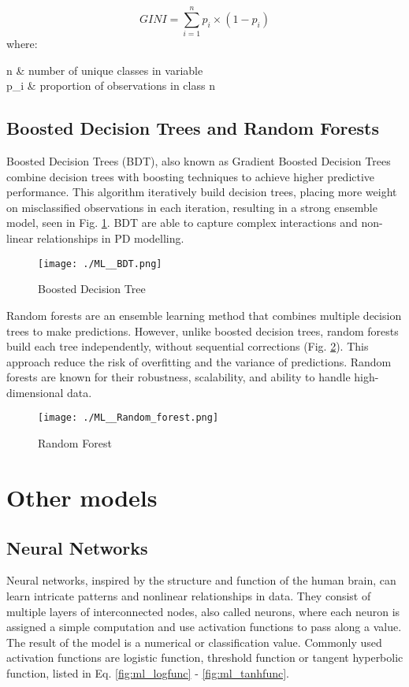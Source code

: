 \begin{equation}
GINI = \sum_{i=1}^{n}  p_i \times (1 - p_i) \label{eq:ml_gini}
\end{equation}
where:
\begin{conditions}
 n  	& number of unique classes in variable \\
 p_{i}  & proportion of observations in class n
\end{conditions}

\subsection{Boosted Decision Trees and Random Forests} 
Boosted Decision Trees (BDT), also known as Gradient Boosted Decision Trees combine decision trees with boosting techniques to achieve higher predictive performance. This algorithm iteratively build decision trees, placing more weight on misclassified observations in each iteration, resulting in a strong ensemble model, seen in Fig. \ref{fig:ml_bdt}. BDT are able to capture complex interactions and non-linear relationships in PD modelling. 

\begin{figure}[H]
	\centering
	\texttt{[image: ./ML\_\_BDT.png]}
    \caption{Boosted Decision Tree}
    \label{fig:ml_bdt}
\end{figure}

Random forests are an ensemble learning method that combines multiple decision trees to make predictions. However, unlike boosted decision trees, random forests build each tree independently, without sequential corrections (Fig. \ref{fig:ml_ranforest}). This approach reduce the risk of overfitting and the variance of predictions. Random forests are known for their robustness, scalability, and ability to handle high-dimensional data.

\begin{figure}[H]
	\centering
	\texttt{[image: ./ML\_\_Random\_forest.png]}
    \caption{Random Forest}
    \label{fig:ml_ranforest}
\end{figure}

\section{Other models}

\subsection{Neural Networks}
Neural networks, inspired by the structure and function of the human brain, can learn intricate patterns and nonlinear relationships in data. They consist of multiple layers of interconnected nodes, also called neurons, where each neuron is assigned a simple computation and use activation functions to pass along a value. The result of the model is a numerical or classification value. Commonly used activation functions are logistic function, threshold function or tangent hyperbolic function, listed in Eq. \ref{fig:ml_logfunc} - \ref{fig:ml_tanhfunc}. 

